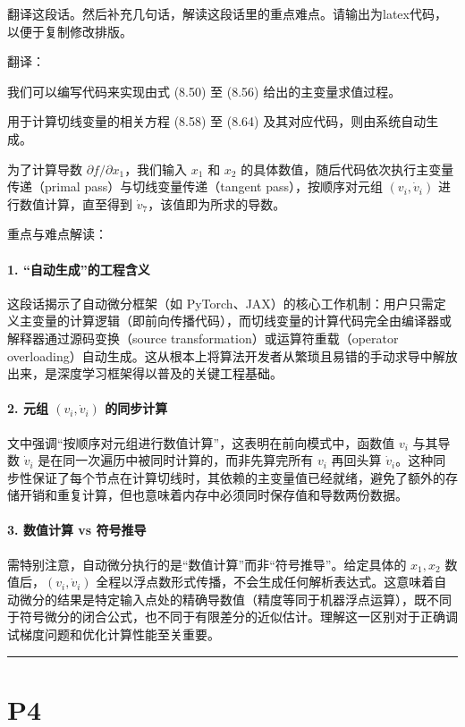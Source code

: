 \documentclass{article}
\begin{document}
翻译这段话。然后补充几句话，解读这段话里的重点难点。请输出为latex代码，以便于复制修改排版。

{\color{red}
翻译：%

我们可以编写代码来实现由式 (8.50) 至 (8.56) 给出的主变量求值过程。

用于计算切线变量的相关方程 (8.58) 至 (8.64) 及其对应代码，则由系统自动生成。

为了计算导数 $\partial f / \partial x_1$，我们输入 $x_1$ 和 $x_2$ 的具体数值，随后代码依次执行主变量传递（primal pass）与切线变量传递（tangent pass），按顺序对元组 $(v_i, \dot{v}_i)$ 进行数值计算，直至得到 $\dot{v}_7$，该值即为所求的导数。
}

{\color{blue}
重点与难点解读：

\paragraph{1. “自动生成”的工程含义}
这段话揭示了自动微分框架（如 PyTorch、JAX）的核心工作机制：用户只需定义主变量的计算逻辑（即前向传播代码），而切线变量的计算代码完全由编译器或解释器通过源码变换（source transformation）或运算符重载（operator overloading）自动生成。这从根本上将算法开发者从繁琐且易错的手动求导中解放出来，是深度学习框架得以普及的关键工程基础。

\paragraph{2. 元组 $(v_i, \dot{v}_i)$ 的同步计算}
文中强调“按顺序对元组进行数值计算”，这表明在前向模式中，函数值 $v_i$ 与其导数 $\dot{v}_i$ 是在同一次遍历中被同时计算的，而非先算完所有 $v_i$ 再回头算 $\dot{v}_i$。这种同步性保证了每个节点在计算切线时，其依赖的主变量值已经就绪，避免了额外的存储开销和重复计算，但也意味着内存中必须同时保存值和导数两份数据。

\paragraph{3. 数值计算 vs 符号推导}
需特别注意，自动微分执行的是“数值计算”而非“符号推导”。给定具体的 $x_1, x_2$ 数值后，$(v_i, \dot{v}_i)$ 全程以浮点数形式传播，不会生成任何解析表达式。这意味着自动微分的结果是特定输入点处的精确导数值（精度等同于机器浮点运算），既不同于符号微分的闭合公式，也不同于有限差分的近似估计。理解这一区别对于正确调试梯度问题和优化计算性能至关重要。
}

\noindent\rule{\linewidth}{0.4pt}

\section{P4}
\end{document}
